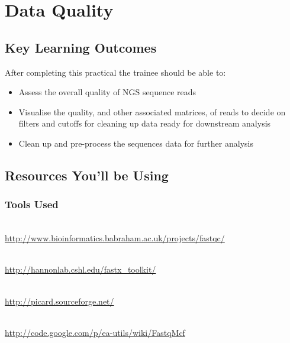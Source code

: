 \renewcommand{\moduleTitle}{Data Quality}
\renewcommand{\moduleAuthors}{%
  Sonika Tyagi \mailto{sonika.tyagi@agrf.org.au}
} \renewcommand{\moduleContributions}{%
  Nathan S. Watson-Haigh \mailto{nathan.watson-haigh@awri.com.au}%
}

\chapter{\moduleTitle}
\newpage

\section{Key Learning Outcomes}

After completing this practical the trainee should be able to:
\begin{itemize}
  \item Assess the overall quality of NGS sequence reads\\
  \item Visualise the quality, and other associated matrices, of reads to decide
        on filters and cutoffs for cleaning up data ready for downstream analysis\\
  \item Clean up and pre-process the sequences data for further analysis\\
\end{itemize}

\section{Resources You'll be Using}
 
\subsection{Tools Used}
\begin{description}[style=multiline,labelindent=0cm,align=left,leftmargin=0.5cm]
  \item[FastQC]\hfill\\
  	\url{http://www.bioinformatics.babraham.ac.uk/projects/fastqc/}
  \item[fastx-toolkit]\hfill\\
  	\url{http://hannonlab.cshl.edu/fastx_toolkit/}
  \item[picard]\hfill\\
  	\url{http://picard.sourceforge.net/}
  \item[fastq-mcf]\hfill\\
  	\url{http://code.google.com/p/ea-utils/wiki/FastqMcf}
\end{description}

